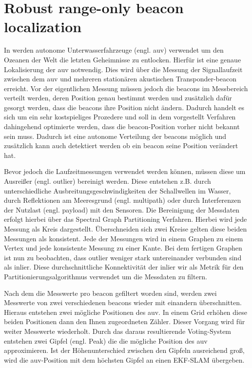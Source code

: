 \section{Robust range-only beacon localization}

In  \cite{olson2004robust} werden autonome Unterwasserfahrzeuge (engl. \gls{auv}) verwendet um den Ozeanen der Welt die letzten Geheimnisse zu entlocken. Hierfür ist eine genaue Lokalisierung der \gls{auv} notwendig. Dies wird über die Messung der Signallaufzeit zwischen dem \gls{auv} und mehreren stationären akustischen Transponder-\Gls{beacon} erreicht. Vor der eigentlichen Messung müssen jedoch die \Glspl{beacon} im Messbereich verteilt werden, deren Position genau bestimmt werden und zusätzlich dafür gesorgt werden, dass die \Glspl{beacon} ihre Position nicht ändern. Dadurch handelt es sich um ein sehr kostspieliges Prozedere und soll in dem vorgestellt Verfahren dahingehend optimierte werden, dass die \Gls{beacon}-Position vorher nicht bekannt sein muss. Dadurch ist eine autonome Verteilung der \Glspl{beacon} möglich und zusätzlich kann auch detektiert werden ob ein \Gls{beacon} seine Position verändert hat.

Bevor jedoch die Laufzeitmessungen verwendet werden können, müssen diese um Ausreißer (engl. \Gls{outlier}) bereinigt werden. Diese entstehen z.B. durch unterschiedliche Ausbreitungsgeschwindigkeiten der Schallwellen im Wasser, durch Reflektionen am Meeresgrund (engl. \Gls{multipath}) oder durch Interferenzen der Nutzlast (engl. \Gls{payload}) mit den Sensoren. Die Bereinigung der Messdaten erfolgt hierbei über das Spectral Graph Partitioning Verfahren. Hierbei wird jede Messung als Kreis dargestellt. Überschneiden sich zwei Kreise gelten diese beiden Messungen als konsistent. Jede der Messungen wird in einem Graphen zu einem Vertex und jede konsistente Messung zu einer Kante. Bei dem fertigen Graphen ist nun zu beobachten, dass \Gls{outlier} weniger stark untereinander verbunden sind als \Gls{inlier}. Diese durchschnittliche Konnektivität der \Gls{inlier} wir als Metrik für den Partitionierungsalgorithmus verwendet um die Messdaten zu filtern.

Nach dem die Messwerte pro \Gls{beacon} gefiltert worden sind, werden zwei Messwerte von zwei verschiedenen \Glspl{beacon} wieder mit einandern überschnitten. Hieraus entstehen zwei mögliche Positionen des \gls{auv}. In einem Grid erhöhen diese beiden Positionen dann den Ihnen zugeordneten Zähler. Dieser Vorgang wird für weiter Messwerte wiederholt. Durch das daraus resultierende Voting-System entstehen zwei Gipfel (engl. Peak) die die mögliche Position des \gls{auv} approximieren. Ist der Höhenunterschied zwischen den Gipfeln ausreichend groß, wird die \gls{auv}-Position mit dem höchsten Gipfel an einen EKF-SLAM übergeben.


